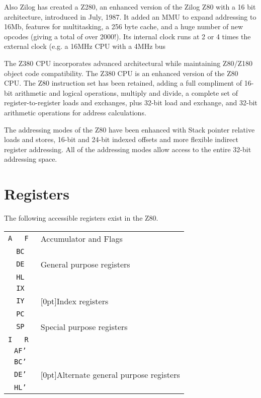 \documentclass[oneside,a4paper]{book}
\begin{document}
Also Zilog has created a Z280, an enhanced version of the Zilog Z80 with a 16 bit architecture, introduced in July, 1987. It added an MMU to expand addressing to 16Mb, features for multitasking, a 256 byte cache, and a huge number of new opcodes (giving a total of over 2000!). Its internal clock runs at 2 or 4 times the external clock (e.g. a 16MHz CPU with a 4MHz bus

The Z380 CPU incorporates advanced architectural while maintaining Z80/Z180 object code compatibility. The Z380 CPU is an enhanced version of the Z80 CPU. The Z80 instruction set has been retained, adding a full compliment of 16-bit arithmetic and logical operations, multiply and divide, a complete set of register-to-register loads and exchanges, plus 32-bit load and exchange, and 32-bit arithmetic operations for address calculations.

The addressing modes of the Z80 have been enhanced with Stack pointer relative loads and stores, 16-bit and 24-bit indexed offsets and more flexible indirect register addressing. All of the addressing modes allow access to the entire 32-bit addressing space.


\section{Registers}

The following accessible registers exist in the Z80.

\begin{tabular}{|c|c|l}
	\cline{1-2}
	\tt A & \tt F & Accumulator and Flags \\ \cline{1-2} \cline{1-2}
	\multicolumn{2}{|c|}{\tt BC} & \\ \cline{1-2}
	\multicolumn{2}{|c|}{\tt DE} & General purpose registers \\ \cline{1-2}
	\multicolumn{2}{|c|}{\tt HL} & \\ \cline{1-2}
	\multicolumn{2}{|c|}{\tt IX} & \\ \cline{1-2}
	\multicolumn{2}{|c|}{\tt IY} & \raisebox{1.5ex}[0pt]{Index registers} \\ \cline{1-2}
	\multicolumn{2}{|c|}{\tt PC} & \\ \cline{1-2}
	\multicolumn{2}{|c|}{\tt SP} & Special purpose registers \\ \cline{1-2}
	\tt I & \tt R & \\ \cline{1-2}
	\multicolumn{2}{|c|}{\tt AF'} & \\ \cline{1-2}
	\multicolumn{2}{|c|}{\tt BC'} & \\ \cline{1-2}
	\multicolumn{2}{|c|}{\tt DE'} & \raisebox{1.5ex}[0pt]{Alternate general purpose registers}\\ \cline{1-2}
	\multicolumn{2}{|c|}{\tt HL'} & \\ \cline{1-2}
\end{tabular}
\end{document}
